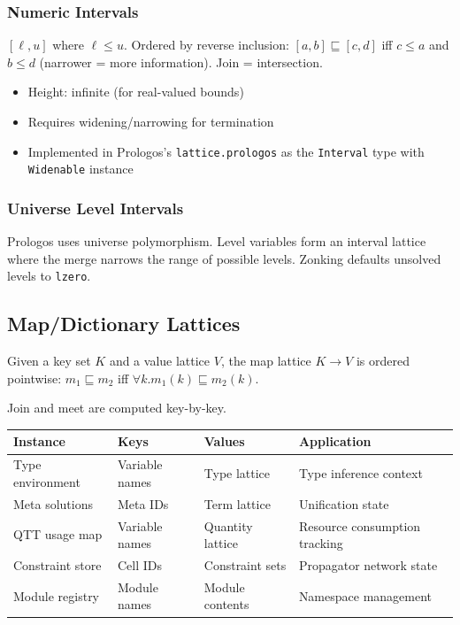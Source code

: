 \documentclass[11pt]{article}
\begin{document}
\subsubsection{Numeric Intervals}
\label{sec:org35e78e3}

\([\ell, u]\) where \(\ell \leq u\). Ordered by reverse inclusion: \([a,b]
\sqsubseteq [c,d]\) iff \(c \leq a\) and \(b \leq d\) (narrower = more information).
Join = intersection.

\begin{itemize}
\item Height: infinite (for real-valued bounds)
\item Requires widening/narrowing for termination
\item Implemented in Prologos's \texttt{lattice.prologos} as the \texttt{Interval} type with
\texttt{Widenable} instance
\end{itemize}
\subsubsection{Universe Level Intervals}
\label{sec:org2d5c361}

Prologos uses universe polymorphism. Level variables form an interval lattice
where the merge narrows the range of possible levels. Zonking defaults unsolved
levels to \texttt{lzero}.
\subsection{Map/Dictionary Lattices}
\label{sec:orgd5162cf}

Given a key set \(K\) and a value lattice \(V\), the map lattice \(K \to V\) is ordered
pointwise: \(m_1 \sqsubseteq m_2\) iff \(\forall k. m_1(k) \sqsubseteq m_2(k)\).

Join and meet are computed key-by-key.

\begin{center}
\begin{tabular}{llll}
Instance & Keys & Values & Application\\
\hline
Type environment & Variable names & Type lattice & Type inference context\\
Meta solutions & Meta IDs & Term lattice & Unification state\\
QTT usage map & Variable names & Quantity lattice & Resource consumption tracking\\
Constraint store & Cell IDs & Constraint sets & Propagator network state\\
Module registry & Module names & Module contents & Namespace management\\
\end{tabular}
\end{center}
\end{document}
